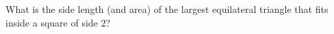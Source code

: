 What is the side length (and area) of the largest equilateral triangle that fits inside a square of side $2$?
